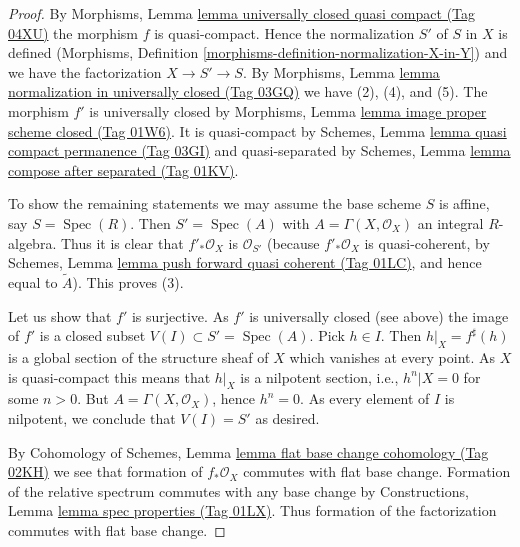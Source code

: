\documentclass{amsart}
\theoremstyle{plain}
\theoremstyle{definition}
\theoremstyle{remark}
\numberwithin{equation}{subsection}
\def\Spec{\mathop{\mathrm{Spec}}}
\begin{document}
\begin{proof}
By Morphisms, Lemma \href{https://stacks.math.columbia.edu/tag/04XU}{lemma universally closed quasi compact (Tag 04XU)}
the morphism $f$ is quasi-compact. Hence the normalization $S'$ of $S$ in
$X$ is defined (Morphisms, Definition
\ref{morphisms-definition-normalization-X-in-Y})
and we have the factorization $X \to S' \to S$. By
Morphisms, Lemma \href{https://stacks.math.columbia.edu/tag/03GQ}{lemma normalization in universally closed (Tag 03GQ)}
we have (2), (4), and (5). The morphism $f'$ is universally closed by
Morphisms, Lemma \href{https://stacks.math.columbia.edu/tag/01W6}{lemma image proper scheme closed (Tag 01W6)}.
It is quasi-compact by
Schemes, Lemma \href{https://stacks.math.columbia.edu/tag/03GI}{lemma quasi compact permanence (Tag 03GI)}
and quasi-separated by
Schemes, Lemma \href{https://stacks.math.columbia.edu/tag/01KV}{lemma compose after separated (Tag 01KV)}.

\medskip\noindent
To show the remaining statements we may assume the base scheme $S$ is affine,
say $S = \Spec(R)$. Then $S' = \Spec(A)$ with
$A = \Gamma(X, \mathcal{O}_X)$ an integral $R$-algebra.
Thus it is clear that $f'_*\mathcal{O}_X$
is $\mathcal{O}_{S'}$ (because $f'_*\mathcal{O}_X$ is quasi-coherent,
by
Schemes, Lemma
\href{https://stacks.math.columbia.edu/tag/01LC}{lemma push forward quasi coherent (Tag 01LC)},
and hence equal to $\widetilde{A}$). This proves (3).

\medskip\noindent
Let us show that $f'$ is surjective. As $f'$ is universally closed (see above)
the image of $f'$ is a closed subset
$V(I) \subset S' = \Spec(A)$. Pick $h \in I$. Then
$h|_X = f^\sharp(h)$ is a global section of the structure sheaf of
$X$ which vanishes at every point. As $X$ is quasi-compact this means
that $h|_X$ is a nilpotent section, i.e., $h^n|X = 0$ for some $n > 0$.
But $A = \Gamma(X, \mathcal{O}_X)$, hence $h^n = 0$.
As every element of $I$ is nilpotent, we conclude that $V(I) = S'$ as desired.

\medskip\noindent
By Cohomology of Schemes, Lemma \href{https://stacks.math.columbia.edu/tag/02KH}{lemma flat base change cohomology (Tag 02KH)}
we see that formation of $f_*\mathcal{O}_X$ commutes with flat base change.
Formation of the relative spectrum commutes with any base change by
Constructions, Lemma \href{https://stacks.math.columbia.edu/tag/01LX}{lemma spec properties (Tag 01LX)}.
Thus formation of the factorization commutes with flat base change.
\end{proof}
\end{document}
